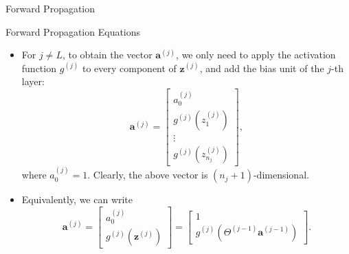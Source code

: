 \documentclass[8pt,american]{beamer}
\begin{document}
\begin{frame}{Forward Propagation}

\begin{block}{Forward Propagation Equations}
\begin{itemize}
\justifying
\item For $j\neq L$, to obtain the vector $\mathbf{a}^{\left(j\right)}$, we
  only need to apply the activation function $g^{\left(j\right)}$ to every
  component of $\mathbf{z}^{\left(j\right)}$, and add the bias unit of the
  $j$-th layer:
  \begin{equation}
  \mathbf{a}^{\left(j\right)}=\begin{bmatrix}a_0^{\left(j\right)}\\
  g^{\left(j\right)}\left(z_{1}^{\left(j\right)}\right)\\
  \vdots\\
  g^{\left(j\right)}\left(z_{n_{j}}^{\left(j\right)}\right)
  \end{bmatrix},
  \end{equation}
  where $a_0^{\left(j\right)}=1$. Clearly, the above vector is
  $\left(n_{j}+1\right)$-dimensional.
\item Equivalently, we can write
  \begin{equation}
  \mathbf{a}^{\left(j\right)}=\begin{bmatrix}a_0^{\left(j\right)}\\
  g^{\left(j\right)}\left(\mathbf{z}^{\left(j\right)}\right)
  \end{bmatrix}=\begin{bmatrix}1\\
  g^{\left(j\right)}\left(\Theta^{\left(j-1\right)}\mathbf{a}^{\left(j-1\right)}\right)
  \end{bmatrix}.
  \end{equation}
\end{itemize}
\end{block}

\end{frame}
\end{document}
